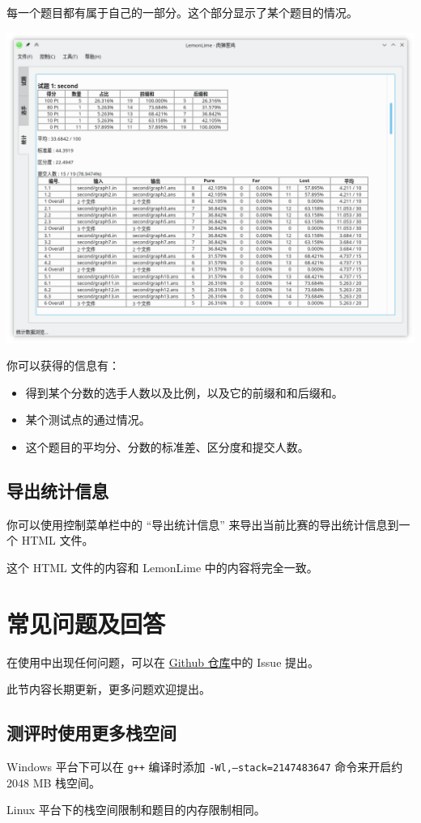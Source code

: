 \documentclass[UTF-8]{ctexart}
\begin{document}
			每一个题目都有属于自己的一部分。这个部分显示了某个题目的情况。

			\begin{center}
			\includegraphics[scale=0.5]{pics/statistics2.png}
			\end{center}

			你可以获得的信息有：

			\begin{itemize}
				\item 得到某个分数的选手人数以及比例，以及它的前缀和和后缀和。
				\item 某个测试点的通过情况。
				\item 这个题目的平均分、分数的标准差、区分度和提交人数。
			\end{itemize}

		\subsection{导出统计信息}

			你可以使用控制菜单栏中的 “导出统计信息” 来导出当前比赛的导出统计信息到一个 HTML 文件。

			这个 HTML 文件的内容和 LemonLime 中的内容将完全一致。

	\newpage

	\section{常见问题及回答}

		在使用中出现任何问题，可以在 \href{https://github.com/Project-LemonLime/Project_LemonLime}{Github 仓库}中的 Issue 提出。

		此节内容长期更新，更多问题欢迎提出。

		\subsection{测评时使用更多栈空间}

			Windows 平台下可以在 \texttt{g++} 编译时添加 \texttt{-Wl,--stack=2147483647} 命令来开启约 2048 MB 栈空间。

			Linux 平台下的栈空间限制和题目的内存限制相同。

	\newpage
\end{document}

